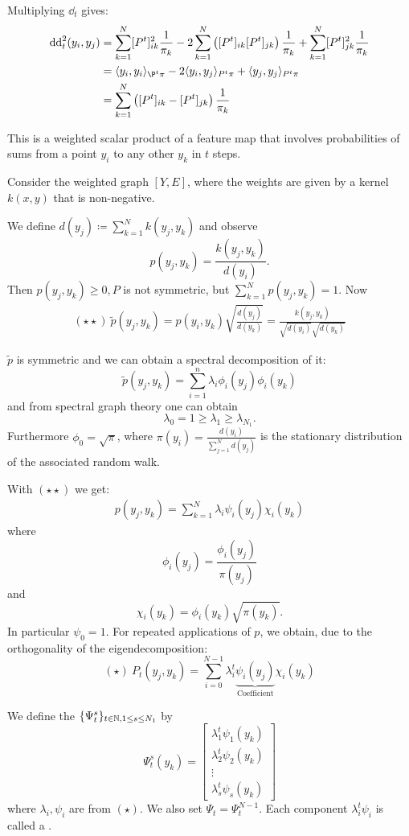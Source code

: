 Multiplying $\dd_t$ gives:
\begin{align*}
    \dd_t^2(y_i,y_j)&= \sum_{k=1}^N[P^t]_{ik}^2\frac{1}{\pi_k}-2\sum_{k=1}^N \left([P^t]_{ik}[P^t]_{jk}\right)\frac{1}{\pi_k}+\sum_{k=1}^N [P^t]_{jk}^2\frac{1}{\pi_k}\\
    &=\langle y_i,y_i\rangle_{\P^t\pi}-2\langle y_i,y_j\rangle_{P^t\pi}+\langle y_j,y_j\rangle_{P^t\pi}\\
    &=\sum_{k=1}^N\left([P^t]_{ik}-[P^t]_{jk}\right)\frac{1}{\pi_k}
\end{align*}

This is a weighted scalar product of a feature map that involves probabilities of sums from a point $y_i$ to any other $y_k$ in $t$ steps.

Consider the weighted graph $[Y,E]$, where the weights are given by a kernel 
$k(x,y)$
that is non-negative. 

We define $d(y_j)\coloneqq \sum_{k=1}^N k(y_j,y_k)$ and observe 
\[p(y_j,y_k)=\frac{k(y_j,y_k)}{d(y_i)}.\]
Then $p(y_j,y_k)\geq 0, P$ is not symmetric, but $\sum_{k=1}^N p(y_j,y_k)=1$. Now 
\begin{align*}
    (\star\star)\ \tilde{p}(y_j,y_k)=p(y_i,y_k)\sqrt{\frac{d(y_j)}{d(y_k)}}=\frac{k(y_j,y_k)}{\sqrt{d(y_i)}\sqrt{d(y_k)}}
\end{align*}

$\tilde{p}$ is symmetric and we can obtain a spectral decomposition of it:
\[\tilde{p}(y_j,y_k)=\sum_{i=1}^n\lambda_i\phi_i(y_j)\phi_i(y_k)\]
and from spectral graph theory one can obtain
\[\lambda_0=1\geq \lambda_1\geq \lambda_{N_1}.\]
Furthermore $\phi_0=\sqrt{\pi}$, where $\pi(y_i)=\frac{d(y_i)}{\sum_{j=1}^N d(y_j)}$
is the stationary distribution of the associated random walk.

With $(\star\star)$ we get:
\begin{align*}
    p(y_j,y_k)=\sum_{k=1}^N\lambda_i\psi_i(y_j)\chi_i(y_k)
\end{align*}
where 
\[\phi_i(y_j)=\frac{\phi_i(y_j)}{\pi(y_j)}\]
and 
\[\chi_i(y_k)=\phi_i(y_k)\sqrt{\pi(y_k)}.\]
In particular $\psi_0=1$. For repeated applications of $p$, we obtain, due to the orthogonality of the eigendecomposition:
\[(\star)\ P_t(y_j,y_k)=\sum_{i=0}^{N-1}\lambda_i^t\underbrace{\psi_i(y_j)}_{\text{Coefficient}}\chi_i(y_k)\]

\begin{definition}\label{def:2.27a}
    We define the  $\{\Psi_t^s\}_{t\in\mathbb{N},1\leq s\leq N_1}$ by 
    \[\Psi_t^s(y_k)=\begin{bmatrix}
        \lambda_1^t\psi_1(y_k)\\
        \lambda_2^t\psi_2(y_k)\\
        \vdots\\
        \lambda_s^t\psi_s(y_k)
    \end{bmatrix}\]
    where $\lambda_i,\psi_i$ are from $(\star)$. We also set $\Psi_t=\Psi_t^{N-1}$. Each component 
    $\lambda_i^t\psi_i$ is called a .
\end{definition}

